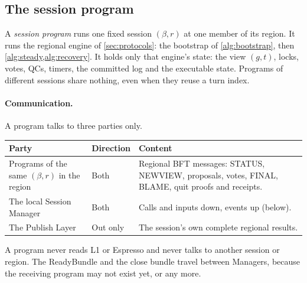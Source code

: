 \documentclass[11pt,a4paper]{article}
\newcommand{\defterm}[1]{\textcolor{rrBlue}{\textit{#1}}}
\newcounter{protocol}
\begin{document}
\subsection{The session program}
\label{sec:session-lifecycle}
A \defterm{session program} runs one fixed session $(\beta,r)$ at one
member of its region. It runs the regional engine of
\cref{sec:protocols}: the bootstrap of \cref{alg:bootstrap}, then
\cref{alg:steady,alg:recovery}. It holds only that engine's state: the
view $(g,t)$, locks, votes, QCs, timers, the committed log and the
executable state. Programs of different sessions share nothing, even
when they reuse a turn index.

\paragraph{Communication.}
A program talks to three parties only.
\begin{center}\small
\begin{tabularx}{\linewidth}{@{}>{\raggedright\arraybackslash}p{.3\linewidth}>{\raggedright\arraybackslash}p{.12\linewidth}Y@{}}\toprule
Party & Direction & Content\\\midrule
Programs of the same $(\beta,r)$ in the region & Both & Regional BFT
messages: STATUS, NEWVIEW, proposals, votes, FINAL, BLAME, quit proofs
and receipts.\\
The local Session Manager & Both & Calls and inputs down, events up
(below).\\
The Publish Layer & Out only & The session's own complete regional
results.\\\bottomrule
\end{tabularx}
\end{center}
A program never reads L1 or Espresso and never talks to another session
or region. The ReadyBundle and the close bundle travel between Managers,
because the receiving program may not exist yet, or any more.
\end{document}
